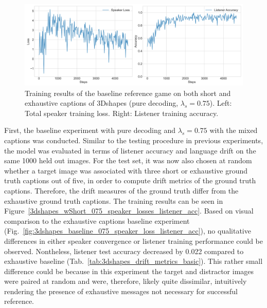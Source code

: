 \begin{figure}
	\centering
	\includegraphics[width=\linewidth]{images/3dshapes_wShort_baseline_random_075_losses.png}
	\caption{Training results of the baseline reference game on both short and exhaustive captions of 3Dshapes (pure decoding, $\lambda_s=0.75$). Left: Total speaker training loss. Right: Listener training accuracy.}
	\label{fig:3dshapes_wShort_075_speaker_losses_listener_acc}
\end{figure}

First, the baseline experiment with pure decoding and $\lambda_s = 0.75$ with the mixed captions was conducted. Similar to the testing procedure in previous experiments, the model was evaluated in terms of listener accuracy and language drift on the same 1000 held out images. For the test set, it was now also chosen at random whether a target image was associated with three short or exhaustive ground truth captions out of five, in order to compute drift metrics of the ground truth captions. Therefore, the drift measures of the ground truth differ from the exhaustive ground truth captions.
The training results can be seen in Figure~\ref{3dshapes_wShort_075_speaker_losses_listener_acc}. Based on visual comparison to the exhaustive captions baseline experiment (Fig.~\ref{fig:3dshapes_baseline_075_speaker_loss_listener_acc}), no qualitative differences in either speaker convergence or listener training performance could be observed. Nontheless, listener test accuracy decreased by 0.022 compared to exhaustive baseline (Tab.~\ref{tab:3dshapes_drift_metrics_basic}).
This rather small difference could be because in this experiment the target and distractor images were paired at random and were, therefore, likely quite dissimilar, intuitively rendering the presence of exhaustive messages not necessary for successful reference.

